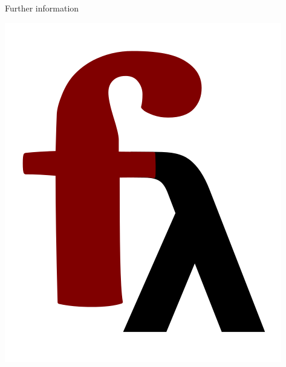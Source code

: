 \begin{frame}[fragile]{Further information}
\begin{minipage}{0.3\textwidth}
\begin{center}
			\vspace{0.3cm}
			\includegraphics[scale=0.1]{images/frege-logo}
		\end{center}
		\vfill
	\end{minipage}	
\end{frame}